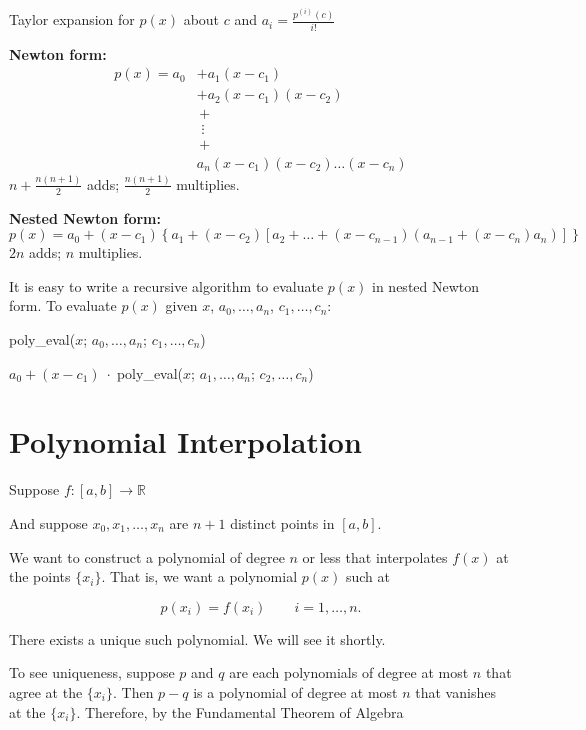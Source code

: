 Taylor expansion for $p(x)$ about $c$ and $a_i = \frac{p^{(i)}(c)}{i!}$

\textbf{Newton form:}
\begin{align*}
p(x) = a_0 &+ a_1 (x-c_1) \\
           &+ a_2 (x-c_1)(x-c_2) \\
           &\,+ \\
           &\,\, \vdots \\
           &\,+ \\
           &a_n (x-c_1)(x-c_2)\dots(x-c_n)
\end{align*}
$n+\frac{n(n+1)}{2}$ adds; $\frac{n(n+1)}{2}$ multiplies.

\textbf{Nested Newton form:}
\begin{equation*}
    p(x) = a_0 + (x-c_1)\left\{a_1 + (x-c_2)\left[a_2 + \dots + (x-c_{n-1})(a_{n-1}+(x-c_n)a_n)\right]\right\}
\end{equation*}
$2n$ adds; $n$ multiplies. 

It is easy to write a recursive algorithm to evaluate $p(x)$ in nested Newton form. To evaluate $p(x)$ given $x$, $a_0, \dots, a_n$, $c_1, \dots, c_n$: 

\quad \textsf{poly\_eval}($x$; $a_0, \dots, a_n$; $c_1, \dots, c_n$)

\qquad \qquad $a_0 + (x-c_1)\;\cdot\; $\textsf{poly\_eval}($x$; $a_1, \dots, a_n$; $c_2, \dots, c_n$)

\section{Polynomial Interpolation}

Suppose $f: [a,b] \rightarrow \mathbb{R}$ 

And suppose $x_0, x_1, \dots , x_n$ are $n+1$ distinct points in $[a,b]$. 

We want to construct a polynomial of degree $n$ or less that interpolates $f(x)$ at the points $\{x_i\}$. 
That is, we want a polynomial $p(x)$ such at

\begin{equation*}
    p(x_i) = f(x_i) \qquad i = 1, \dots, n.
\end{equation*}

There exists a unique such polynomial. We will see it shortly. 

To see uniqueness, suppose $p$ and $q$ are each polynomials of degree at most $n$ that agree at the $\{x_i\}$. 
Then $p-q$ is a polynomial of degree at most $n$ that vanishes at the $\{x_i\}$. 
Therefore, by the Fundamental Theorem of Algebra

